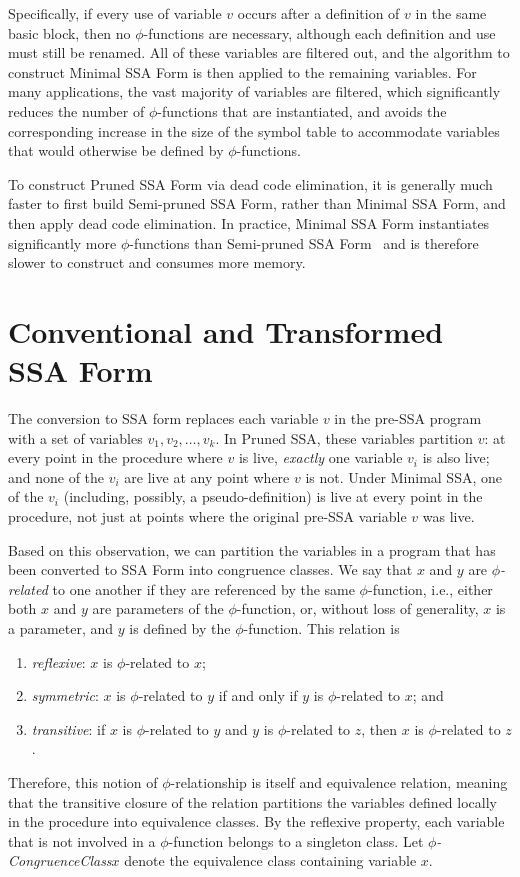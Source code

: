 Specifically, if every use of variable $v$ occurs after
a definition of $v$ in the same basic block, then no
$\phi$-functions are necessary, although each definition
and use must still be renamed. All of these variables
are filtered out, and the algorithm to construct
Minimal SSA Form is then applied to the remaining 
variables. For many applications, the vast majority 
of variables are filtered, which significantly reduces
the number of $\phi$-functions that are instantiated,
and avoids the corresponding increase in the size of the
symbol table to accommodate variables that would otherwise
be defined by $\phi$-functions. 

To construct Pruned SSA Form via dead code elimination,
it is generally much faster to first build Semi-pruned SSA
Form, rather than Minimal SSA Form, and then apply
dead code elimination. In practice, Minimal SSA Form
instantiates significantly more $\phi$-functions than
Semi-pruned SSA Form~\cite{BriggsJul98} and is
therefore slower to construct and consumes more
memory. 

\section{Conventional and Transformed SSA Form}
\label{sec-prop-conventional}

The conversion to SSA form replaces each variable $v$ in the pre-SSA
program with a set of variables $v_{1}, v_{2}, \ldots, v_{k}$. In Pruned
SSA, these variables partition $v$: at every point in the procedure where $v$ is
live, \emph{exactly} one variable $v_{i}$ is also live; and none of
the $v_{i}$ are live at any point where $v$ is not. Under Minimal SSA, 
one of the $v_{i}$ (including, possibly, a pseudo-definition) is live
at every point in the procedure, not just at points where the original
pre-SSA variable $v$ was live. 

Based on this observation, we can partition the variables in a 
program that has been converted to SSA Form into congruence classes. 
We say that $x$ and $y$ are \emph{$\phi$-related} to one another
if they are referenced by the same $\phi$-function, i.e., 
either both $x$ and $y$ are parameters of the $\phi$-function, or,
without loss of generality, $x$ is a parameter, and $y$ is defined by
the $\phi$-function. This relation is
\begin{enumerate}
\item \emph{reflexive}: $x$ is $\phi$-related to $x$;
\item \emph{symmetric}: $x$ is $\phi$-related to $y$ if and only if
$y$ is $\phi$-related to $x$; and
\item \emph{transitive}: if $x$ is $\phi$-related to $y$ and 
$y$ is $\phi$-related to $z$, then $x$ is $\phi$-related to $z$.
\end{enumerate}
Therefore, this notion of $\phi$-relationship is itself and equivalence
relation, meaning that the transitive closure of the relation partitions
the variables defined locally in the procedure into equivalence classes. 
By the reflexive property, each variable that is not involved in a 
$\phi$-function belongs to a singleton class. 
Let \emph{$\phi$-CongruenceClass${x}$} denote the equivalence class 
containing variable $x$. 


